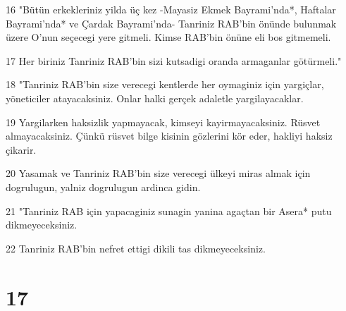 \par 16 "Bütün erkekleriniz yilda üç kez -Mayasiz Ekmek Bayrami'nda*, Haftalar Bayrami'nda* ve Çardak Bayrami'nda- Tanriniz RAB'bin önünde bulunmak üzere O'nun seçecegi yere gitmeli. Kimse RAB'bin önüne eli bos gitmemeli.
\par 17 Her biriniz Tanriniz RAB'bin sizi kutsadigi oranda armaganlar götürmeli."
\par 18 "Tanriniz RAB'bin size verecegi kentlerde her oymaginiz için yargiçlar, yöneticiler atayacaksiniz. Onlar halki gerçek adaletle yargilayacaklar.
\par 19 Yargilarken haksizlik yapmayacak, kimseyi kayirmayacaksiniz. Rüsvet almayacaksiniz. Çünkü rüsvet bilge kisinin gözlerini kör eder, hakliyi haksiz çikarir.
\par 20 Yasamak ve Tanriniz RAB'bin size verecegi ülkeyi miras almak için dogrulugun, yalniz dogrulugun ardinca gidin.
\par 21 "Tanriniz RAB için yapacaginiz sunagin yanina agaçtan bir Asera* putu dikmeyeceksiniz.
\par 22 Tanriniz RAB'bin nefret ettigi dikili tas dikmeyeceksiniz.

\chapter{17}

